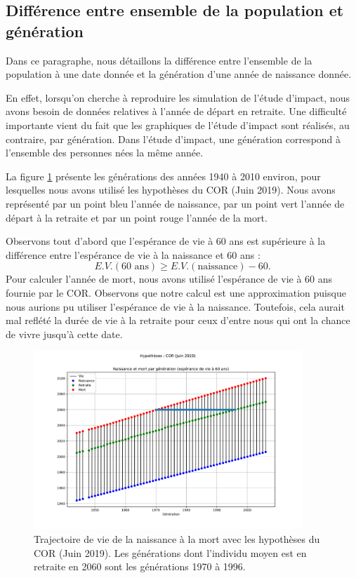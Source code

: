 \documentclass[10pt]{article}
\begin{document}
\subsection{Différence entre ensemble de la population et génération}

Dans ce paragraphe, nous détaillons la différence entre 
l'ensemble de la population à une date donnée et la génération d'une année 
de naissance donnée. 

En effet, lorsqu'on cherche à reproduire les simulation de l'étude d'impact, nous 
avons besoin de données relatives à l'année de départ en retraite. 
Une difficulté importante vient du fait que les graphiques de l'étude 
d'impact sont réalisés, au contraire, par génération. 
Dans l'étude d'impact, une génération correspond à l'ensemble des personnes 
nées la même année. 

La figure \ref{fig-trajectoire-vie} présente les générations des années 1940 
à 2010 environ, pour lesquelles nous avons utilisé les hypothèses du COR (Juin 2019).
Nous avons représenté par un point bleu l'année de naissance, par un point 
vert l'année de départ à la retraite et par un point rouge l'année de la 
mort. 

Observons tout d'abord que l'espérance de vie à 60 ans est supérieure à la 
différence entre l'espérance de vie à la naissance et 60 ans :
$$
E.V.(\textrm{60 ans}) \geq E.V.(\textrm{naissance}) - 60.
$$
Pour calculer l'année de mort, nous avons utilisé l'espérance de vie à 60 ans 
fournie par le COR. 
Observons que notre calcul est une approximation puisque nous aurions pu utiliser 
l'espérance de vie à la naissance. 
Toutefois, cela aurait mal reflété la durée de vie à la retraite pour ceux 
d'entre nous qui ont la chance de vivre jusqu'à cette date. 

\begin{figure}
\begin{center}
\includegraphics[width=0.9\textwidth]{Simulation-generation-vs-annee.pdf}
\end{center}
\caption{Trajectoire de vie de la naissance à la mort avec 
les hypothèses du COR (Juin 2019). 
Les générations dont l'individu moyen est en retraite en 2060 
sont les générations 1970 à 1996. }
\label{fig-trajectoire-vie}
\end{figure}
\end{document}
